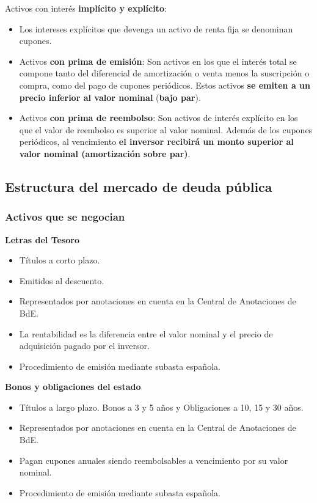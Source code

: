 \documentclass[
  letterpaper,
  DIV=11,
  numbers=noendperiod]{scrreprt}
\begin{document}
\begin{tcolorbox}
Activos con interés \textbf{implícito y explícito}:

\begin{itemize}
\item
  Los intereses explícitos que devenga un activo de renta fija se
  denominan cupones.
\item
  Activos \textbf{con prima de emisión}: Son activos en los que el
  interés total se compone tanto del diferencial de amortización o venta
  menos la suscripción o compra, como del pago de cupones periódicos.
  Estos activos \textbf{se emiten a un precio inferior al valor nominal}
  (\textbf{bajo par}).
\item
  Activos \textbf{con prima de reembolso}: Son activos de interés
  explícito en los que el valor de reembolso es superior al valor
  nominal. Además de los cupones periódicos, al vencimiento \textbf{el
  inversor recibirá un monto superior al valor nominal (amortización
  sobre par)}.
\end{itemize}

\subsection{Estructura del mercado de deuda
pública}\label{estructura-del-mercado-de-deuda-puxfablica}

\subsubsection{Activos que se negocian}\label{activos-que-se-negocian}

\textbf{Letras del Tesoro}

\begin{itemize}
\item
  Títulos a corto plazo.
\item
  Emitidos al descuento.
\item
  Representados por anotaciones en cuenta en la Central de Anotaciones
  de BdE.
\item
  La rentabilidad es la diferencia entre el valor nominal y el precio de
  adquisición pagado por el inversor.
\item
  Procedimiento de emisión mediante subasta española.
\end{itemize}

\textbf{Bonos y obligaciones del estado}

\begin{itemize}
\item
  Títulos a largo plazo. Bonos a 3 y 5 años y Obligaciones a 10, 15 y 30
  años.
\item
  Representados por anotaciones en cuenta en la Central de Anotaciones
  de BdE.
\item
  Pagan cupones anuales siendo reembolsables a vencimiento por su valor
  nominal.
\item
  Procedimiento de emisión mediante subasta española.
\end{itemize}


\end{tcolorbox}
\end{document}
